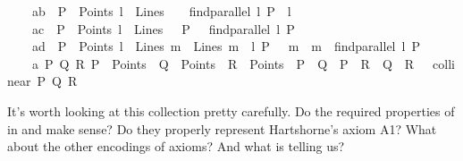 \begin{isabellebody}
\ \ \ \ a{}b{\isacharcolon}{\kern0pt}\ {\isachardoublequoteopen}{\isasymlbrakk}\ P\ {\isasymin}\ Points{\isacharsemicolon}{\kern0pt}\ l\ {\isasymin}\ Lines{\isasymrbrakk}\ {\isasymLongrightarrow}\ \ {\isacharparenleft}{\kern0pt}\ find{\isacharunderscore}{\kern0pt}parallel\ l\ P{\isacharparenright}{\kern0pt}\ {\isacharbar}{\kern0pt}{\isacharbar}{\kern0pt}\ l{\isachardoublequoteclose}\ \isanewline
\ \ \ \ a{}c{\isacharcolon}{\kern0pt}\ {\isachardoublequoteopen}{\isasymlbrakk}\ P\ {\isasymin}\ Points{\isacharsemicolon}{\kern0pt}\ l\ {\isasymin}\ Lines{\isasymrbrakk}\ {\isasymLongrightarrow}\ \ P\ {\isasymlhd}\ \ {\isacharparenleft}{\kern0pt}find{\isacharunderscore}{\kern0pt}parallel\ l\ P{\isacharparenright}{\kern0pt}{\isachardoublequoteclose}\ \isanewline
\ \ \ \ a{}d{\isacharcolon}{\kern0pt}\ {\isachardoublequoteopen}{\isasymlbrakk}\ P\ {\isasymin}\ Points{\isacharsemicolon}{\kern0pt}\ l\ {\isasymin}\ Lines{\isacharsemicolon}{\kern0pt}\ m\ {\isasymin}\ Lines{\isacharsemicolon}{\kern0pt}\ m\ {\isacharbar}{\kern0pt}{\isacharbar}{\kern0pt}\ l{\isacharsemicolon}{\kern0pt}\ P\ {\isasymlhd}\ \ m{\isasymrbrakk}\ {\isasymLongrightarrow}\ m\ {\isacharequal}{\kern0pt}\ find{\isacharunderscore}{\kern0pt}parallel\ l\ P{\isachardoublequoteclose}\ \isanewline
\ \ \ \ a{}{\isacharcolon}{\kern0pt}\ {\isachardoublequoteopen}{\isasymexists}P\ Q\ R{\isachardot}{\kern0pt}\ P\ {\isasymin}\ Points\ {\isasymand}\ Q\ {\isasymin}\ Points\ {\isasymand}\ R\ {\isasymin}\ Points\ {\isasymand}\ P\ {\isasymnoteq}\ Q\ {\isasymand}\ P\ {\isasymnoteq}\ R\ {\isasymand}\ Q\ {\isasymnoteq}\ R\ {\isasymand}\ {\isasymnot}\ {\isacharparenleft}{\kern0pt}collinear\ P\ Q\ R{\isacharparenright}{\kern0pt}{\isachardoublequoteclose}\isanewline
{}%
\begin{isamarkuptext}%
It's worth looking at this collection pretty carefully. Do the required properties of  in
 and  make sense? Do they properly represent Hartshorne's axiom A1? What about the 
other encodings of axioms? And what is  telling us? 


\end{isamarkuptext}
\end{isabellebody}
